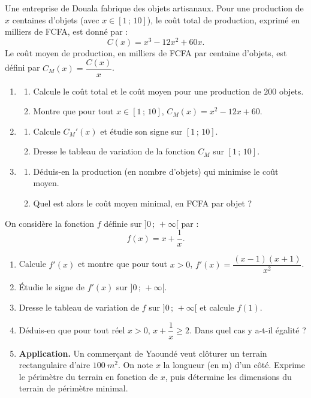 \documentclass[11pt]{article}
\newcommand{\cle}[1]{{\popxbold\color{popdark}#1}}
\begin{document}
\begin{exercice}
Une entreprise de Douala fabrique des objets artisanaux. Pour une production de $x$ centaines d'objets (avec $x \in [1\,;\,10]$), le coût total de production, exprimé en milliers de FCFA, est donné par :
\[ C(x) = x^3 - 12x^2 + 60x. \]
Le \cle{coût moyen} de production, en milliers de FCFA par centaine d'objets, est défini par $C_M(x) = \dfrac{C(x)}{x}$.
\begin{enumerate}
\item \begin{enumerate}
\item Calcule le coût total et le coût moyen pour une production de $200$ objets.
\item Montre que pour tout $x \in [1\,;\,10]$, $C_M(x) = x^2 - 12x + 60$.
\end{enumerate}
\item \begin{enumerate}
\item Calcule $C_M'(x)$ et étudie son signe sur $[1\,;\,10]$.
\item Dresse le tableau de variation de la fonction $C_M$ sur $[1\,;\,10]$.
\end{enumerate}
\item \begin{enumerate}
\item Déduis-en la production (en nombre d'objets) qui minimise le coût moyen.
\item Quel est alors le coût moyen minimal, en FCFA par objet ?
\end{enumerate}
\end{enumerate}
\end{exercice}

\begin{exercice}
On considère la fonction $f$ définie sur $]0\,;\,+\infty[$ par :
\[ f(x) = x + \dfrac{1}{x}. \]
\begin{enumerate}
\item Calcule $f'(x)$ et montre que pour tout $x > 0$, $f'(x) = \dfrac{(x-1)(x+1)}{x^2}$.
\item Étudie le signe de $f'(x)$ sur $]0\,;\,+\infty[$.
\item Dresse le tableau de variation de $f$ sur $]0\,;\,+\infty[$ et calcule $f(1)$.
\item Déduis-en que pour tout réel $x > 0$, $x + \dfrac{1}{x} \geq 2$. Dans quel cas y a-t-il égalité ?
\item \textbf{Application.} Un commerçant de Yaoundé veut clôturer un terrain rectangulaire d'aire $\SI{100}{m^2}$. On note $x$ la longueur (en m) d'un côté. Exprime le périmètre du terrain en fonction de $x$, puis détermine les dimensions du terrain de périmètre minimal.
\end{enumerate}
\end{exercice}
\end{document}
